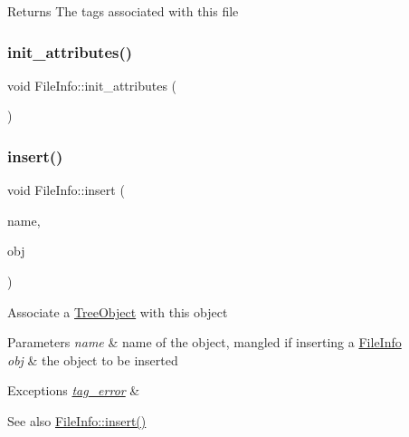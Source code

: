 \begin{DoxyReturn}{Returns}
The tags associated with this file 
\end{DoxyReturn}
\mbox{\label{class_file_info_abad45da4fbc2f1da564a23a2c3e6caff}} 
\subsubsection{\texorpdfstring{init\+\_\+attributes()}{init\_attributes()}}
{\footnotesize\ttfamily void File\+Info\+::init\+\_\+attributes (\begin{DoxyParamCaption}{ }\end{DoxyParamCaption})\hspace{0.3cm}{\ttfamily [private]}}

\mbox{\label{class_file_info_ad93a84b63e417b07aa68b619051ab746}} 
\subsubsection{\texorpdfstring{insert()}{insert()}}
{\footnotesize\ttfamily void File\+Info\+::insert (\begin{DoxyParamCaption}\item[{string}]{name,  }\item[{\mbox{\hyperlink{class_tree_object}{Tree\+Object}} $\ast$}]{obj }\end{DoxyParamCaption})\hspace{0.3cm}{\ttfamily [virtual]}}

Associate a \mbox{\hyperlink{class_tree_object}{Tree\+Object}} with this object 
\begin{DoxyParams}{Parameters}
{\em name} & name of the object, mangled if inserting a \mbox{\hyperlink{class_file_info}{File\+Info}} \\
\hline
{\em obj} & the object to be inserted \\
\hline
\end{DoxyParams}

\begin{DoxyExceptions}{Exceptions}
{\em \mbox{\hyperlink{classtag__error}{tag\+\_\+error}}} & \\
\hline
\end{DoxyExceptions}
\begin{DoxySeeAlso}{See also}
\mbox{\hyperlink{class_file_info_ad93a84b63e417b07aa68b619051ab746}{File\+Info\+::insert()}} 
\end{DoxySeeAlso}


